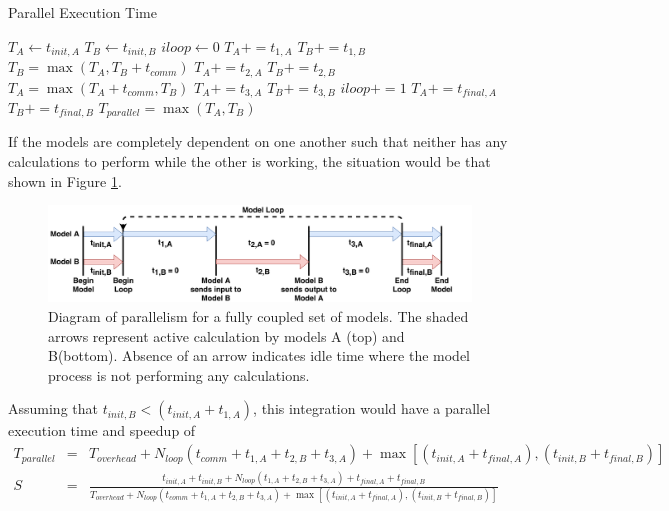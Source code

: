 \documentclass[journal]{IEEEtran}
\begin{document}
%
%
%
\begin{algorithm}[H]
    \caption{Parallel Execution Time}
    \label{alg:tpara}
    \begin{algorithmic}[1] 
    \State $T_{A} \gets t_{init,A}$
    \State $T_{B} \gets t_{init,B}$
    \State $iloop \gets 0$
    	\State $T_{A} += t_{1,A}$
	\State $T_{B} += t_{1,B}$
	\State $T_{B} = \max(T_{A}, T_{B} + t_{comm})$ 
	\State $T_{A} += t_{2,A}$
	\State $T_{B} += t_{2,B}$
	\State $T_{A} = \max(T_{A} + t_{comm}, T_{B})$ 
	\State $T_{A} += t_{3,A}$
	\State $T_{B} += t_{3,B}$
	\State $iloop += 1$
    \EndWhile
    \State $T_{A} += t_{final,A}$
    \State $T_{B} += t_{final,B}$
    \State $T_{parallel} = \max(T_{A}, T_{B})$
    \end{algorithmic}
\end{algorithm}
%
If the models are completely dependent on one another such that neither has any calculations to perform while the other is working, the situation would be that shown in Figure \ref{fig:serial}. 
%
\ifinclfig
 	\begin{figure}[htbp]
	\begin{center}
	\includegraphics[width=\columnwidth,keepaspectratio]{./images/Parallelism-Serial.png}
	\caption{Diagram of parallelism for a fully coupled set of models. The shaded arrows represent active calculation by models A (top) and B(bottom). Absence of an arrow indicates idle time where the model process is not performing any calculations.}
	\label{fig:serial}
	\end{center}
	\end{figure}
\fi
%
Assuming that $t_{init,B} < (t_{init,A} + t_{1,A})$, this integration would have a parallel execution time and speedup of
%
\begin{eqnarray}
T_{parallel} & = & T_{overhead} + N_{loop}(t_{comm} + t_{1,A} + t_{2,B} + t_{3,A}) + \max\left[(t_{init,A} + t_{final,A}), (t_{init,B} + t_{final,B})\right] \\
S & = & \frac{t_{init,A} + t_{init,B} + N_{loop}(t_{1,A} + t_{2,B} + t_{3,A}) + t_{final, A} + t_{final, B}}{T_{overhead} + N_{loop}(t_{comm} + t_{1,A} + t_{2,B} + t_{3,A}) + \max\left[(t_{init,A} + t_{final,A}), (t_{init,B} + t_{final,B})\right]}
\end{eqnarray} 
\end{document}
